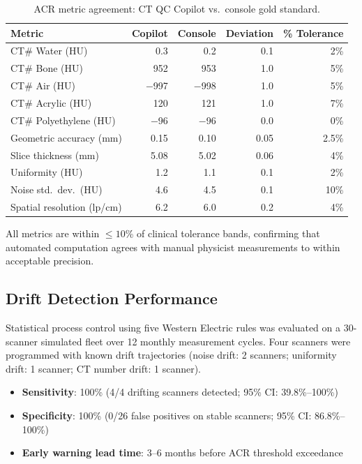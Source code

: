 \documentclass[11pt]{article}
\begin{document}
\begin{table}[htbp]
\centering
\caption{ACR metric agreement: CT QC Copilot vs.\ console gold standard.}
\label{tab:acr_metrics}
\begin{tabular}{l r r r r}
\toprule
\textbf{Metric} & \textbf{Copilot} & \textbf{Console} &
  \textbf{Deviation} & \textbf{\% Tolerance} \\
\midrule
CT\# Water (HU)          & 0.3     & 0.2     & 0.1   & 2\% \\
CT\# Bone (HU)           & 952     & 953     & 1.0   & 5\% \\
CT\# Air (HU)            & $-$997  & $-$998  & 1.0   & 5\% \\
CT\# Acrylic (HU)        & 120     & 121     & 1.0   & 7\% \\
CT\# Polyethylene (HU)   & $-$96   & $-$96   & 0.0   & 0\% \\
Geometric accuracy (mm)  & 0.15    & 0.10    & 0.05  & 2.5\% \\
Slice thickness (mm)     & 5.08    & 5.02    & 0.06  & 4\% \\
Uniformity (HU)          & 1.2     & 1.1     & 0.1   & 2\% \\
Noise std.\ dev.\ (HU)  & 4.6     & 4.5     & 0.1   & 10\% \\
Spatial resolution (lp/cm) & 6.2   & 6.0     & 0.2   & 4\% \\
\bottomrule
\end{tabular}
\end{table}

\noindent All metrics are within $\leq 10$\% of clinical tolerance bands,
confirming that automated computation agrees with manual physicist
measurements to within acceptable precision.

\subsection{Drift Detection Performance}

Statistical process control using five Western Electric rules was
evaluated on a 30-scanner simulated fleet over 12 monthly measurement
cycles.  Four scanners were programmed with known drift trajectories
(noise drift: 2 scanners; uniformity drift: 1 scanner; CT number drift:
1 scanner).

\begin{itemize}
  \item \textbf{Sensitivity}: 100\% (4/4 drifting scanners detected;
    95\% CI: 39.8\%--100\%)
  \item \textbf{Specificity}: 100\% (0/26 false positives on stable
    scanners; 95\% CI: 86.8\%--100\%)
  \item \textbf{Early warning lead time}: 3--6 months before ACR
    threshold exceedance
\end{itemize}
\end{document}
